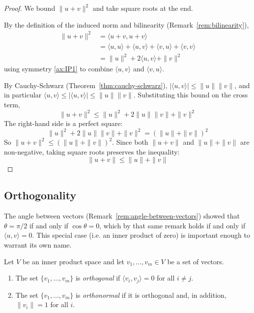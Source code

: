 		\begin{proof}
			We bound $\|u+v\|^2$ and take square roots at the end.
			
			By the definition of the induced norm and bilinearity (Remark~\ref{rem:bilinearity}),
			\begin{align*}
				\|u+v\|^2 &= \langle u+v, u+v \rangle \\
				&= \langle u,u\rangle + \langle u,v\rangle + \langle v,u\rangle + \langle v,v\rangle \\
				&= \|u\|^2 + 2\langle u,v\rangle + \|v\|^2
			\end{align*}
			using symmetry \ref{ax:IP1} to combine $\langle u,v\rangle$ and $\langle v,u\rangle$.
			
			By Cauchy-Schwarz (Theorem~\ref{thm:cauchy-schwarz}), $|\langle u,v\rangle| \le \|u\|\|v\|$, and in particular $\langle u,v\rangle \le |\langle u,v\rangle| \le \|u\|\|v\|$. Substituting this bound on the cross term,
			\[
				\|u+v\|^2 \le \|u\|^2 + 2\|u\|\|v\| + \|v\|^2
			\]
			The right-hand side is a perfect square:
			\[
				\|u\|^2 + 2\|u\|\|v\| + \|v\|^2 = \left(\|u\| + \|v\|\right)^2
			\]
			So $\|u+v\|^2 \le \left(\|u\|+\|v\|\right)^2$. Since both $\|u+v\|$ and $\|u\|+\|v\|$ are non-negative, taking square roots preserves the inequality:
			\[
				\|u+v\| \le \|u\| + \|v\|
			\]
		\end{proof}
		
	\subsection{Orthogonality}
		
		\noindent The angle between vectors (Remark~\ref{rem:angle-between-vectors}) showed that $\theta = \pi/2$ if and only if $\cos\theta = 0$, which by that same remark holds if and only if $\langle u, v \rangle = 0$. This special case (i.e. an inner product of zero) is important enough to warrant its own name.
		
		\begin{definition}
			\label{def:orthogonal-orthonormal-set}
			Let $V$ be an inner product space and let $v_1, \dots, v_m \in V$ be a set of vectors.
			\begin{enumerate}[label=\roman*.]
				\item The set $\{v_1,\dots,v_m\}$ is \emph{orthogonal} if $\langle v_i, v_j \rangle = 0$ for all $i \neq j$.
				\item The set $\{v_1,\dots,v_m\}$ is \emph{orthonormal} if it is orthogonal and, in addition, $\|v_i\| = 1$ for all $i$.
			\end{enumerate}
		\end{definition}
		
